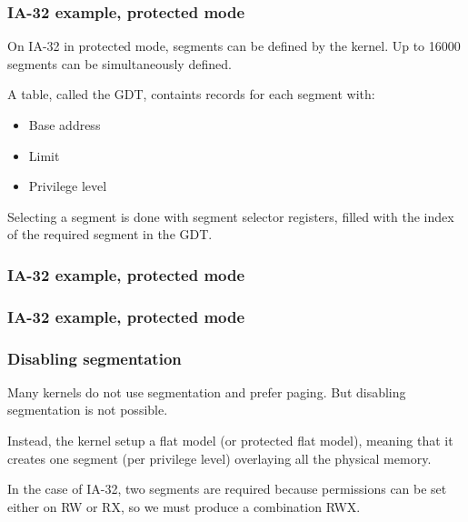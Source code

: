 
\begin{frame}
  \frametitle{IA-32 example, protected mode}

  On IA-32 in protected mode, segments can be defined by the
  kernel. Up to 16000 segments can be simultaneously defined.

  \-

  A table, called the GDT, containts records for each segment with:

  \begin{itemize}
  \item
    Base address
  \item
    Limit
  \item
    Privilege level
  \end{itemize}

  \-

  Selecting a segment is done with segment selector registers, filled
  with the index of the required segment in the GDT.

\end{frame}


\begin{frame}
  \frametitle{IA-32 example, protected mode}

  \begin{center}
  \end{center}

\end{frame}


\begin{frame}
  \frametitle{IA-32 example, protected mode}

  \begin{center}
  \end{center}

\end{frame}


\begin{frame}
  \frametitle{Disabling segmentation}

  Many kernels do not use segmentation and prefer paging. But
  disabling segmentation is not possible.

  \-

  Instead, the kernel setup a flat model (or protected flat model),
  meaning that it creates one segment (per privilege level) overlaying
  all the physical memory.

  \-

  In the case of IA-32, two segments are required because permissions
  can be set either on RW or RX, so we must produce a combination RWX.

\end{frame}

